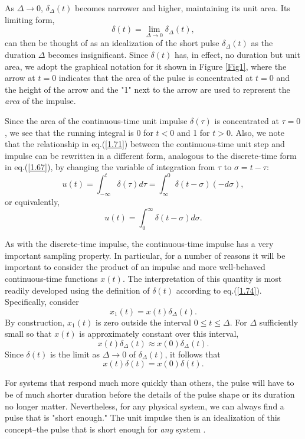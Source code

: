 \documentclass[a4paper,10pt,twoside]{book}
\begin{document}
As $\Delta\to 0$, $\delta_{\Delta}(t)$ becomes narrower and higher, maintaining its unit area. Its limiting form,
\begin{equation}
    \delta(t) = \lim_{\Delta\to0}\delta_{\Delta}(t),
    \label{1.74}
\end{equation}
can then be thought of as an idealization of the short pulse $\delta_{\Delta}(t)$ as the duration $\Delta$ becomes insignificant. Since $\delta(t)$ has, in effect, no duration but unit area, we adopt the graphical notation for it shown in Figure \ref{Fig1}, where the arrow at $t=0$ indicates that the area of the pulse is concentrated at $t=0$ and the height of the arrow and the "1" next to the arrow are used to represent the \textit{area} of the impulse.

Since the area of the continuous-time unit impulse $\delta(\tau)$ is concentrated at $\tau=0$, we see that the running integral is 0 for $t<0$ and 1 for $t>0$. Also, we note that the relationship in eq.\;(\ref{1.71}) between the continuous-time unit step and impulse can be rewritten in a different form, analogous to the discrete-time form in eq.\;(\ref{1.67}), by changing the variable of integration from $\tau$ to $\sigma=t-\tau$:$$u(t) = \int_{-\infty}^{t}\delta(\tau) d\tau = \int_{\infty}^{0}\delta(t-\sigma)(-d\sigma),$$ or equivalently,
\begin{equation}
    u(t)=\int_0^\infty\delta(t-\sigma) d\sigma.
    \label{1.75}
\end{equation}

As with the discrete-time impulse, the continuous-time impulse has a very important sampling property. In particular, for a number of reasons it will be important to consider the product of an impulse and more well-behaved continuous-time functions $x(t)$. The interpretation of this quantity is most readily developed using the definition of $\delta(t)$ according to eq.\;(\ref{1.74}). Specifically, consider $$x_1(t)=x(t)\delta_{\Delta}(t).$$ By construction, $x_1(t)$ is zero outside the interval $0\le t\le\Delta$. For $\Delta$ sufficiently small so that $x(t)$ is approximately constant over this interval, $$x(t)\delta_{\Delta}(t)\approx x(0)\delta_{\Delta}(t).$$ Since $\delta(t)$ is the limit as $\Delta\to 0$ of $\delta_{\Delta}(t)$, it follows that
\begin{equation}
    x(t)\delta(t)=x(0)\delta(t).
\end{equation}

For systems that respond much more quickly than others, the pulse will have to be of much shorter duration before the details of the pulse shape or its duration no longer matter. Nevertheless, for any physical system, we can always find a pulse that is "short enough." The unit impulse then is an idealization of this concept--the pulse that is short enough for \textit{any} system
.
\end{document}
